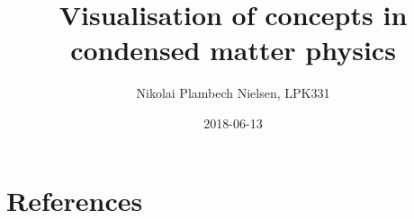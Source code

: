 \documentclass[a4paper,11pt]{article}
\title{Visualisation of concepts in condensed matter physics}
\author{Nikolai Plambech Nielsen, LPK331}
\date{2018-06-13}
\numberwithin{equation}{section}
\begin{document}
	
	\maketitle
	
	\tableofcontents
	
	\newpage
	
	
	
	
	
	
	
	
	\section{References}
	
	
	\newpage
	\appendix
	
	
\end{document}
